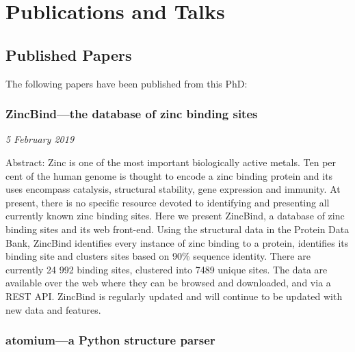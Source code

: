 



\chapter{Publications and Talks} %



\section{Published Papers}

The following papers have been published from this PhD:

\subsection{ZincBind—the database of zinc binding sites}

\emph{5 February 2019}

Abstract: Zinc is one of the most important biologically active metals. Ten per cent of the human genome is thought to encode a zinc binding protein and its uses encompass catalysis, structural stability, gene expression and immunity. At present, there is no specific resource devoted to identifying and presenting all currently known zinc binding sites. Here we present ZincBind, a database of zinc binding sites and its web front-end. Using the structural data in the Protein Data Bank, ZincBind identifies every instance of zinc binding to a protein, identifies its binding site and clusters sites based on 90\% sequence identity. There are currently 24 992 binding sites, clustered into 7489 unique sites. The data are available over the web where they can be browsed and downloaded, and via a REST API. ZincBind is regularly updated and will continue to be updated with new data and features.


\subsection{atomium—a Python structure parser}

